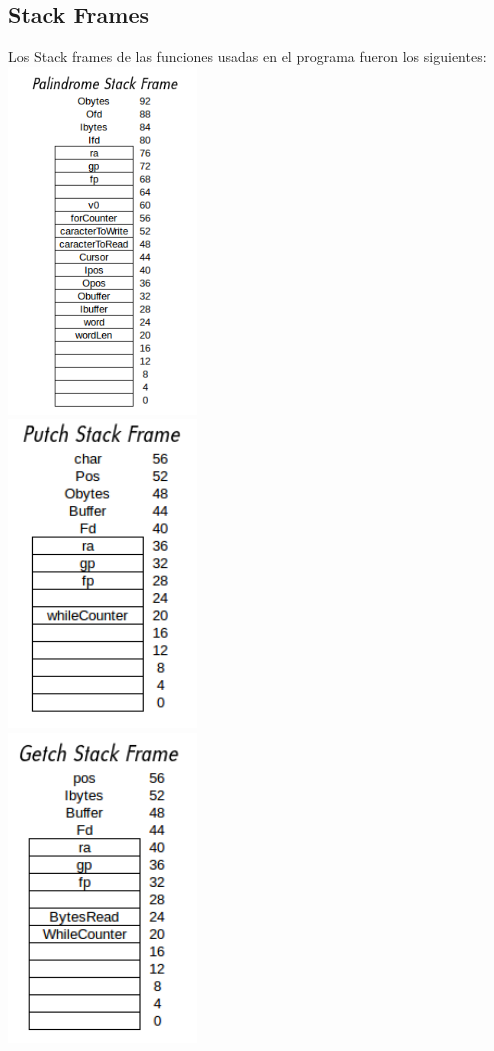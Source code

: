 \documentclass[a4paper,10pt]{article}
\begin{document}
        \subsection{Stack Frames}
        Los Stack frames de las funciones usadas en el programa fueron los siguientes:
        \includegraphics[width=5cm]{plots/PalindromeStack.png}\\
        \includegraphics[width=5cm]{plots/putchStack.png}\\
        \includegraphics[width=5cm]{plots/getchStack.png}\\
\end{document}
